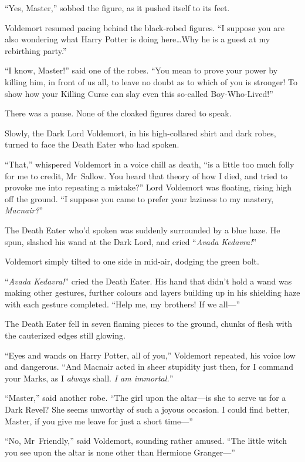 “Yes, Master,” sobbed the figure, as it pushed itself to its feet.

Voldemort resumed pacing behind the black-robed figures. “I suppose you are also wondering what Harry Potter is doing here…Why he is a guest at my rebirthing party.”

“I know, Master!” said one of the robes. “You mean to prove your power by killing him, in front of us all, to leave no doubt as to which of you is stronger! To show how your Killing Curse can slay even this so-called Boy-Who-Lived!”

There was a pause. None of the cloaked figures dared to speak.

Slowly, the Dark Lord Voldemort, in his high-collared shirt and dark robes, turned to face the Death Eater who had spoken.

“That,” whispered Voldemort in a voice chill as death, “is a little too much folly for me to credit, Mr~Sallow. You heard that theory of how I died, and tried to provoke me into repeating a mistake?” Lord Voldemort was floating, rising high off the ground. “I suppose you came to prefer your laziness to my mastery, \emph{Macnair?}”

The Death Eater who’d spoken was suddenly surrounded by a blue haze. He spun, slashed his wand at the Dark Lord, and cried “\emph{Avada Kedavra!}”

Voldemort simply tilted to one side in mid-air, dodging the green bolt.

“\emph{Avada Kedavra!}” cried the Death Eater. His hand that didn’t hold a wand was making other gestures, further colours and layers building up in his shielding haze with each gesture completed. “Help me, my brothers! If we all—”

The Death Eater fell in seven flaming pieces to the ground, chunks of flesh with the cauterized edges still glowing.

“Eyes and wands on Harry Potter, all of you,” Voldemort repeated, his voice low and dangerous. “And Macnair acted in sheer stupidity just then, for I command your Marks, as I \emph{always} shall. \emph{I am immortal.}”

“Master,” said another robe. “The girl upon the altar—is she to serve us for a Dark Revel? She seems unworthy of such a joyous occasion. I could find better, Master, if you give me leave for just a short time—”

“No, Mr~Friendly,” said Voldemort, sounding rather amused. “The little witch you see upon the altar is none other than Hermione Granger—”

